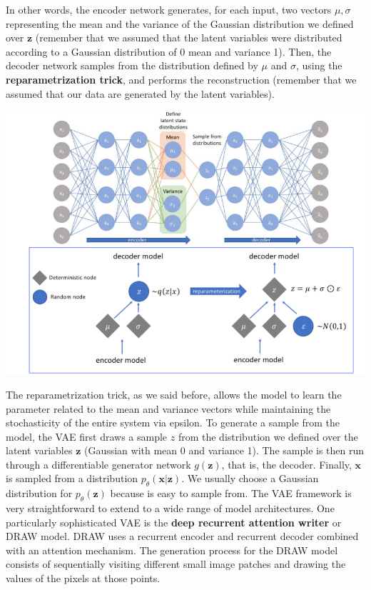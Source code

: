 In other words, the encoder network generates, for each input, two vectors $\mu, \sigma$ representing the mean and the variance of the Gaussian distribution we defined over $\textbf{z}$ (remember that we assumed that the latent variables were distributed according to a Gaussian distribution of 0 mean and variance 1). Then, the decoder network samples from the distribution defined by $\mu$ and $\sigma$, using the \textbf{reparametrization trick}, and performs the reconstruction (remember that we assumed that our data are generated by the latent variables).
\begin{center}
    \includegraphics[scale=0.8]{images/VAE2.png}
\end{center}
The reparametrization trick, as we said before, allows the model to learn the parameter related to the mean and variance vectors while maintaining the stochasticity of the entire system via epsilon.\newline\newline 
To generate a sample from the model, the VAE first draws a sample $z$ from the distribution we defined over the latent variables $\textbf{z}$ (Gaussian with mean 0 and variance 1). The sample is then run through a differentiable generator network $g(\textbf{z})$, that is, the decoder. Finally, $\textbf{x}$ is sampled from a distribution $p_{\theta}(\textbf{x}|\textbf{z})$. We usually choose a Gaussian distribution for $p_{\theta}(\textbf{z})$ because is easy to sample from.\newline\newline
The VAE framework is very straightforward to extend to a wide range of model
architectures. One particularly sophisticated VAE is the \textbf{deep recurrent attention writer} or DRAW model. DRAW uses a recurrent encoder and recurrent decoder combined with an attention mechanism. The generation process for the DRAW model consists of sequentially visiting different small image patches and drawing the values of the pixels at those points.

